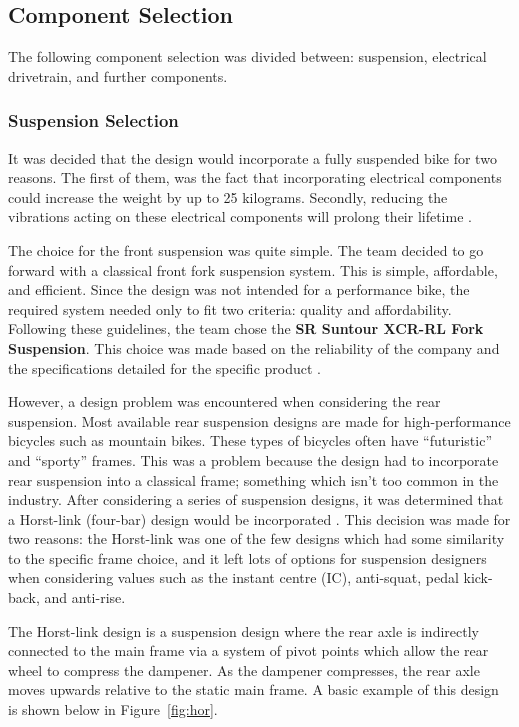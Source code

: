 \documentclass[a4paper,11pt]{article}
\begin{document}
\subsection{Component Selection}
\label{sec:comps}

The following component selection was divided between: suspension, electrical drivetrain, and further components.

\subsubsection{Suspension Selection}

It was decided that the design would incorporate a fully suspended bike for two reasons. The first of them, was the fact that incorporating electrical components could increase the weight by up to 25 kilograms. Secondly, reducing the vibrations acting on these electrical components will prolong their lifetime \cite{muetz07}.

The choice for the front suspension was quite simple. The team decided to go forward with a classical front fork suspension system. This is simple, affordable, and efficient. Since the design was not intended for a performance bike, the required system needed only to fit two criteria: quality and affordability. Following these guidelines, the team chose the \textbf{SR Suntour XCR-RL Fork Suspension}. This choice was made based on the reliability of the company and the specifications detailed for the specific product \cite{suntour}. 

However, a design problem was encountered when considering the rear suspension. Most available rear suspension designs are made for high-performance bicycles such as mountain bikes. These types of bicycles often have ``futuristic'' and ``sporty'' frames. This was a problem because the design had to incorporate rear suspension into a classical frame; something which isn't too common in the industry. After considering a series of suspension designs, it was determined that a Horst-link (four-bar) design would be incorporated \cite{stott}. This decision was made for two reasons: the Horst-link was one of the few designs which had some similarity to the specific frame choice, and it left lots of options for suspension designers when considering values such as the instant centre (IC), anti-squat, pedal kick-back, and anti-rise.

The Horst-link design is a suspension design where the rear axle is indirectly connected to the main frame via a system of pivot points which allow the rear wheel to compress the dampener. As the dampener compresses, the rear axle moves upwards relative to the static main frame. A basic example of this design is shown below in Figure~\ref{fig:hor}.
\end{document}
